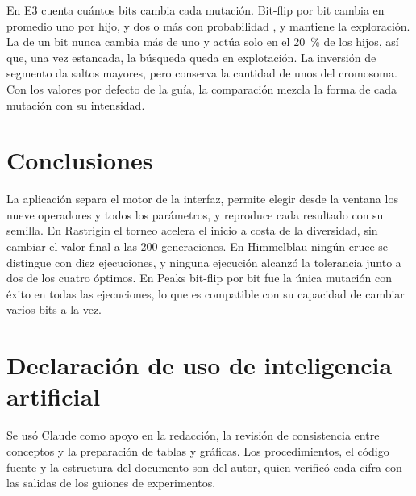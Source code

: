 \documentclass[conference]{IEEEtran}
\begin{document}
En E3 cuenta cuántos bits cambia cada mutación. Bit-flip por bit cambia en promedio uno por hijo, y dos o más con probabilidad \ProbDosBits, y mantiene la exploración. La de un bit nunca cambia más de uno y actúa solo en el 20~\% de los hijos, así que, una vez estancada, la búsqueda queda en explotación. La inversión de segmento da saltos mayores, pero conserva la cantidad de unos del cromosoma. Con los valores por defecto de la guía, la comparación mezcla la forma de cada mutación con su intensidad.

\section{Conclusiones}

La aplicación separa el motor de la interfaz, permite elegir desde la ventana los nueve operadores y todos los parámetros, y reproduce cada resultado con su semilla. En Rastrigin el torneo acelera el inicio a costa de la diversidad, sin cambiar el valor final a las 200 generaciones. En Himmelblau ningún cruce se distingue con diez ejecuciones, y ninguna ejecución alcanzó la tolerancia junto a dos de los cuatro óptimos. En Peaks bit-flip por bit fue la única mutación con éxito en todas las ejecuciones, lo que es compatible con su capacidad de cambiar varios bits a la vez.

\section*{Declaración de uso de inteligencia artificial}

Se usó Claude como apoyo en la redacción, la revisión de consistencia entre conceptos y la preparación de tablas y gráficas. Los procedimientos, el código fuente y la estructura del documento son del autor, quien verificó cada cifra con las salidas de los guiones de experimentos.
\end{document}
